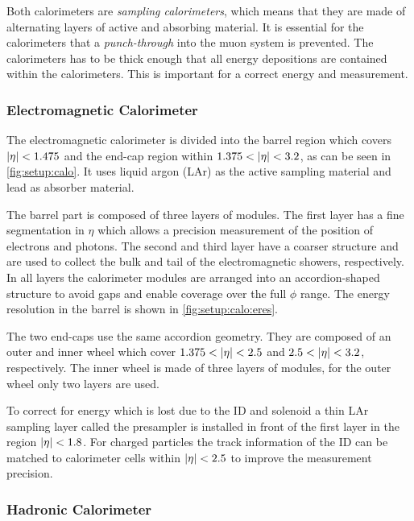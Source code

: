 Both calorimeters are \emph{sampling calorimeters}, which means that they are made of
alternating layers of active and absorbing material.
It is essential for the calorimeters that a \emph{punch-through} into the muon system is prevented.
The calorimeters has to be thick enough that all energy depositions are contained within the calorimeters.
This is important for a correct energy and \etmiss{} measurement.

\subsubsection{Electromagnetic Calorimeter}\label{subsub:setup:ecal}

The electromagnetic calorimeter is divided into the barrel region which covers $\left|\eta\right| < 1.475$ and the
end-cap region within $1.375 < \left|\eta\right| < 3.2$, as can be seen in \cref{fig:setup:calo}.
It uses liquid argon (LAr) as the active sampling material and lead as absorber material.

The barrel part is composed of three layers of modules.
The first layer has a fine segmentation in $\eta$ which allows a precision measurement of the position
of electrons and photons.
The second and third layer have a coarser structure and are used to collect the bulk and tail of
the electromagnetic showers, respectively.
In all layers the calorimeter modules are arranged into an accordion-shaped structure to avoid gaps
and enable coverage over the full $\phi$ range.
The energy resolution in the barrel is shown in \cref{fig:setup:calo:eres}.

The two end-caps use the same accordion geometry.
They are composed of an outer and inner wheel which cover $1.375 < \left|\eta\right| < 2.5$ and $2.5 < \left|\eta\right| < 3.2$, respectively.
The inner wheel is made of three layers of modules, for the outer wheel only two layers are used.

To correct for energy which is lost due to the ID and solenoid a thin LAr sampling layer called the presampler is installed
in front of the first layer in the region $\left|\eta\right| < 1.8$.
For charged particles the track information of the ID can be matched to calorimeter cells within $\left|\eta\right| < 2.5$ to improve
the measurement precision.

\subsubsection{Hadronic Calorimeter}\label{subsub:setup:hcal}

